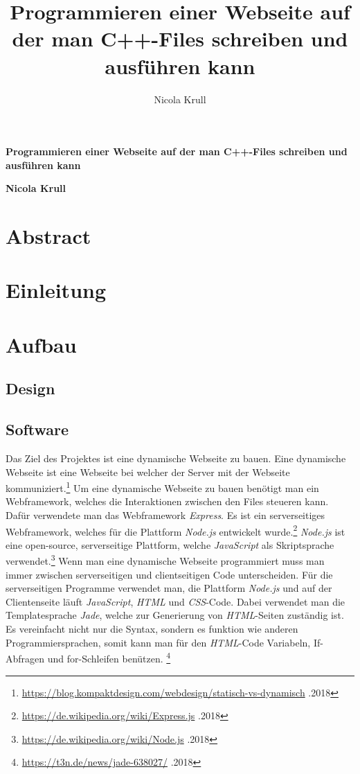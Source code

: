 \documentclass[10pt]{article}
\title{Programmieren einer Webseite auf der man C++-Files schreiben und ausführen kann}
\author{Nicola Krull}
\begin{document}
	
	\begin{titlepage}
	\begin{center}
	\huge
	\textbf{Programmieren einer Webseite auf der man C++-Files schreiben und ausführen kann}
	
	\vspace{1cm}	
	
	\LARGE
	\textbf{Nicola Krull}
	\end{center}
\end{titlepage}
	
	\tableofcontents
	\newpage
	\section{Abstract}
	\section{Einleitung}
	\pagebreak
	\section{Aufbau}
	\subsection{Design}
	
	\subsection{Software}
	Das Ziel des Projektes ist eine dynamische Webseite zu bauen. Eine dynamische Webseite ist eine Webseite bei welcher der Server mit der Webseite kommuniziert.\footnote{\label{foot:1}\href{https://blog.kompaktdesign.com/webdesign/statisch-vs-dynamisch/}{https://blog.kompaktdesign.com/webdesign/statisch-vs-dynamisch} .2018} %
	Um eine dynamische Webseite zu bauen benötigt man ein Webframework, welches die Interaktionen zwischen den 			Files steueren kann. Dafür verwendete man das Webframework \textit{Express}. Es ist ein serverseitiges Webframework, welches für die Plattform \textit{Node.js} entwickelt wurde.\footnote{\label{foot:1}\href{https://de.wikipedia.org/wiki/Express.js}{https://de.wikipedia.org/wiki/Express.js} .2018} \textit{Node.js} ist eine open-source, serverseitige Plattform, welche \textit{JavaScript} als Skriptsprache verwendet.\footnote{\label{foot:2}\href{https://de.wikipedia.org/wiki/Node.js}{https://de.wikipedia.org/wiki/Node.js} .2018}	Wenn man eine dynamische Webseite programmiert muss man immer zwischen serverseitigen und clientseitigen Code unterscheiden. Für die serverseitigen Programme verwendet man, die Plattform \textit{Node.js} und auf der Clientenseite läuft \textit{JavaScript}, \textit{HTML} und \textit{CSS}-Code. Dabei verwendet man die Templatesprache \textit{Jade}, welche zur Generierung von \textit{HTML}-Seiten zuständig ist. Es vereinfacht nicht nur die Syntax, sondern es funktion wie anderen Programmiersprachen, somit kann man für den \textit{HTML}-Code Variabeln, If-Abfragen und for-Schleifen benützen. \footnote{\label{foot:3} \href{https://t3n.de/news/jade-638027/}{https://t3n.de/news/jade-638027/} .2018}
\end{document}
